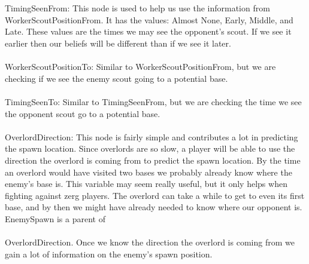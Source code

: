 \\
\\
TimingSeenFrom: This node is used to help us use the information from WorkerScoutPositionFrom. It has the values: Almost None, Early, Middle, and Late. These values are the times we may see the opponent's scout. If we see it earlier then our beliefs will be different than if we see it later.
\\
\\
WorkerScoutPositionTo: Similar to WorkerScoutPositionFrom, but we are checking if we see the enemy scout going to a potential base.
\\
\\
TimingSeenTo: Similar to TimingSeenFrom, but we are checking the time we see the opponent scout go to a potential base.
\\
\\
OverlordDirection: This node is fairly simple and contributes a lot in predicting the spawn location. Since overlords are so slow, a player will be able to use the direction the overlord is coming from to predict the spawn location. By the time an overlord would have visited two bases we probably already know where the enemy's base is. This variable may seem really useful, but it only helps when fighting against zerg players. The overlord can take a while to get to even its first base, and by then we might have already needed to know where our opponent is. EnemySpawn is a parent of 
\\
\\
OverlordDirection. Once we know the direction the overlord is coming from we gain a lot of information on the enemy's spawn position.


